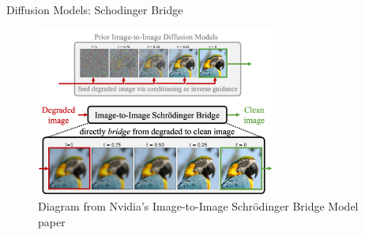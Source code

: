 \begin{frame}{Diffusion Models: Sch\:odinger Bridge}
    \centering
    \begin{figure}
        \includegraphics[height=0.7\textheight,width=0.7\textwidth,keepaspectratio]{images/mm_1.png}
        \caption{Diagram from Nvidia's Image-to-Image Schr\"odinger Bridge Model paper}
    \end{figure}
\end{frame}

